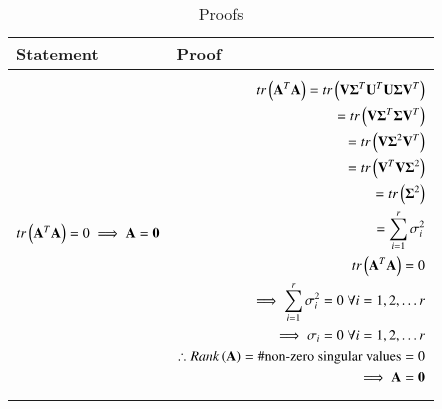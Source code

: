 \begin{table*}[ht!]
\begin{center}
\resizebox{2\columnwidth}{!}
{
\begin{tabular}{|l|l|}
\hline
\textbf{Statement} & \textbf{Proof} \\[0.5ex]
\hline
$tr\left(\mathbf{A}^T\mathbf{A}\right)=0 \implies \mathbf{A}=\mathbf{0}$ & 
 \parbox{10cm}{\begin{align}
    tr\left(\mathbf{A}^T\mathbf{A}\right)=tr\left(\mathbf{V}\mathbf{\Sigma}^T\mathbf{U}^T\mathbf{U}\mathbf{\Sigma}\mathbf{V}^T\right)\\
	=tr\left(\mathbf{V}\mathbf{\Sigma}^T\mathbf{\Sigma}\mathbf{V}^T\right)\\
	=tr\left(\mathbf{V}\mathbf{\Sigma}^2\mathbf{V}^T\right)\\
	=tr\left(\mathbf{V}^T\mathbf{V}\mathbf{\Sigma}^2\right)\\
	=tr\left(\mathbf{\Sigma}^2\right)\\
	=\sum\limits_{i=1}^r \sigma_{i}^2 \\ 
	 tr\left(\mathbf{A}^T\mathbf{A}\right)=0 \\
	\implies \sum\limits_{i=1}^r \sigma_{i}^2=0 \; \forall i=1,2,\dots r\\
	\implies \sigma_i=0 \; \forall i=1,2,\dots r \\
	\therefore Rank\left(\mathbf{A}\right)=\# \text{non-zero singular values}=0\\
	\implies \mathbf{A}=\mathbf{0}
\end{align}}
\\ [0.5ex] 
\hline
$\vec{A}=\vec{0} \implies  tr\brak{\vec{A}^T\vec{A}}=0$
& \parbox{10cm}{\begin{align}
    \vec{A}=\vec{0}\\
    \implies \vec{A}^T\vec{A}=\vec{0}\\
    \implies tr\brak{\vec{A}^T\vec{A}}=0
\end{align}}
\\ [0.5ex] 
\hline
\end{tabular}
}
\end{center}
\caption{Proofs}
\label{eq:solutions/3/7/5/table:2}
\end{table*}
